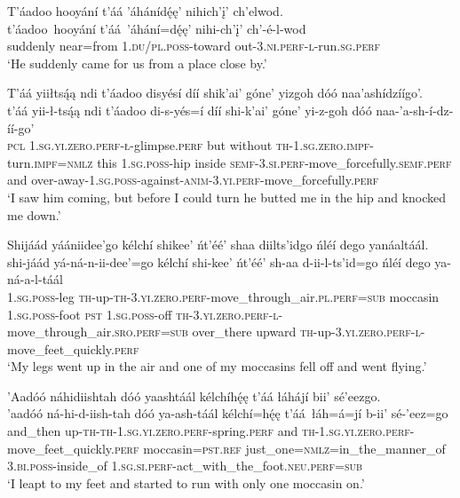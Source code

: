 \ea\label{ex:text6-9-13}
T’áadoo hooyání t’áá ’áhánídę́ę’ nihich’į’ ch’elwod.\\
\gll t’áadoo~{hooyání}	t’áá~{’áhání=dę́ę’}	nihi-ch’į’	ch’-é-l-wod\\
     suddenly	near=from	1.\textsc{du}/\textsc{pl}.\textsc{poss}-toward	out-3.\textsc{ni}.\textsc{perf}-\textsc{l}-run.\textsc{sg}.\textsc{perf}\\
\glt `He suddenly came for us from a place close by.'
\z

\ea\label{ex:text6-9-14}
T’áá yiiłtsą́ą ndi t’áadoo disyésí díí shik’ai’ góne’ yizgoh dóó naa’ashídzíígo’.\\
\gll t’áá	yii-ł-tsą́ą	ndi	t’áadoo	di-s-yés=í	díí	shi-k’ai’	góne’	yi-z-goh	dóó	naa-’a-sh-í-dz-íí-go’\\
     \textsc{pcl}	1.\textsc{sg}.\textsc{yi}.\textsc{zero}.\textsc{perf}-\textsc{ł}-glimpse.\textsc{perf}	but	without	\textsc{th}-1.\textsc{sg}.\textsc{zero}.\textsc{impf}-turn.\textsc{impf}=\textsc{nmlz}	this	1.\textsc{sg}.\textsc{poss}-hip	inside	\textsc{semf}-3.\textsc{si}.\textsc{perf}-move\_forcefully.\textsc{semf}.\textsc{perf}	and	over-away-1.\textsc{sg}.\textsc{poss}-against-\textsc{anim}-3.\textsc{yi}.\textsc{perf}-move\_forcefully.\textsc{perf}\\
\glt `I saw him coming, but before I could turn he butted me in the hip and knocked me down.'
\z

\ea\label{ex:text6-9-15}
Shijáád yáániidee’go kélchí shikee’ ńt’éé’ shaa diilts’idgo ńléí dego yanáaltáál.\\
\gll shi-jáád	yá-ná-n-ii-dee’=go	kélchí	shi-kee’	ńt’éé’	sh-aa	d-ii-l-ts’id=go	ńléí	dego	ya-ná-a-l-táál\\
     1.\textsc{sg}.\textsc{poss}-leg	\textsc{th}-up-\textsc{th}-3.\textsc{yi}.\textsc{zero}.\textsc{perf}-move\_through\_air.\textsc{pl}.\textsc{perf}=\textsc{sub}	moccasin	1.\textsc{sg}.\textsc{poss}-foot	\textsc{pst}	1.\textsc{sg}.\textsc{poss}-off	\textsc{th}-3.\textsc{yi}.\textsc{zero}.\textsc{perf}-\textsc{l}-move\_through\_air.\textsc{sro}.\textsc{perf}=\textsc{sub}	over\_there	upward	\textsc{th}-up-3.\textsc{yi}.\textsc{zero}.\textsc{perf}-\textsc{l}-move\_feet\_quickly.\textsc{perf}\\
\glt `My legs went up in the air and one of my moccasins fell off and went flying.'
\z

\ea\label{ex:text6-9-16}
’Aadóó náhidiishtah dóó yaashtáál kélchíhę́ę t’áá łáhájí bii’ sé’eezgo.\\
\gll ’aadóó	ná-hi-d-iish-tah	dóó	ya-ash-táál	kélchí=hę́ę	t’áá~{łáh=á=jí}	b-ii’	sé-’eez=go\\
     and\_then	up-\textsc{th}-\textsc{th}-1.\textsc{sg}.\textsc{yi}.\textsc{zero}.\textsc{perf}-spring.\textsc{perf}	and	\textsc{th}-1.\textsc{sg}.\textsc{yi}.\textsc{zero}.\textsc{perf}-move\_feet\_quickly.\textsc{perf}	moccasin=\textsc{pst}.\textsc{ref}	just\_one=\textsc{nmlz}=in\_the\_manner\_of	3.\textsc{bi}.\textsc{poss}-inside\_of	1.\textsc{sg}.\textsc{si}.\textsc{perf}-act\_with\_the\_foot.\textsc{neu}.\textsc{perf}=\textsc{sub}\\
\glt `I leapt to my feet and started to run with only one moccasin on.'
\z

